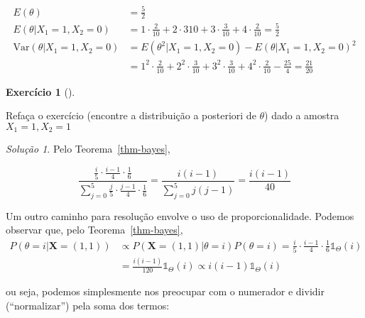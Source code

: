 \documentclass[
  portuguese,
  letterpaper,
  DIV=11,
  numbers=noendperiod]{scrreport}
\theoremstyle{definition}
\newtheorem{exercise}{Exercício}[chapter]
\theoremstyle{definition}
\theoremstyle{plain}
\theoremstyle{remark}
\newtheorem{refsolution}{Solução}[chapter]
\begin{document}
\[
\begin{aligned}
E(\theta) &= \frac{5}{2} \\
E(\theta \rvert X_1 = 1, X_2 = 0)  &= 1 \cdot \frac{2}{10} + 2 \cdot {3}{10} + 3
\cdot \frac {3}{10} + 4 \cdot \frac{2}{10} = \frac{5}{2} \\
\mathrm{Var}(\theta \rvert X_1 = 1, X_2 = 0) &= E(\theta^2 \rvert X_1 = 1, X_2=  0) - E(\theta \rvert X_1 = 1, X_2
= 0)^2 \\ 
&= 1^2 \cdot \frac{2}{10} + 2^2 \cdot \frac{3}{10} + 3^2
\cdot \frac{3}{10} + 4^2 \cdot \frac{2}{10} - \frac{25}{4} = \frac{21}{20}
\end{aligned}
\]

\begin{exercise}[]\protect\hypertarget{exr-urnaoutraamostra}{}\label{exr-urnaoutraamostra}

Refaça o exercício (encontre a distribuição a posteriori de \(\theta\))
dado a amostra \(X_1 = 1, X_2 = 1\)

\end{exercise}

\begin{refsolution}
Pelo Teorema~\ref{thm-bayes},

\[
\frac{\frac{i}{5} \cdot \frac{i-1}{4} \cdot \frac{1}{6}}{\sum\limits^5_{j=0}
\frac{j}{5} \cdot \frac{j-1}{4} \cdot \frac{1}{6}} = \frac{i(i-1)}
{\sum\limits^5_{j=0}j(j-1)} = \frac{i(i-1)}{40}
\]

Um outro caminho para resolução envolve o uso de proporcionalidade.
Podemos observar que, pelo Teorema~\ref{thm-bayes}, \[
\begin{aligned}
P(\theta = i \rvert \boldsymbol{X} = (1,1)) &\propto
P(\boldsymbol{X} = (1,1) \rvert \theta = i)P(\theta = i) = \frac{i}{5} \cdot
\frac{i-1}{4} \cdot \frac{1}{6} \mathbb{1}_{\Theta}(i) \\
&= \frac{i(i-1)}{120}
\mathbb{1}_{\Theta}(i) \propto i(i-1) \mathbb{1}_{\Theta}(i)
\end{aligned}
\]

ou seja, podemos simplesmente nos preocupar com o numerador e dividir
(``normalizar'') pela soma dos termos:

\label{sol-urnaoutraamostra}

\end{refsolution}
\end{document}
